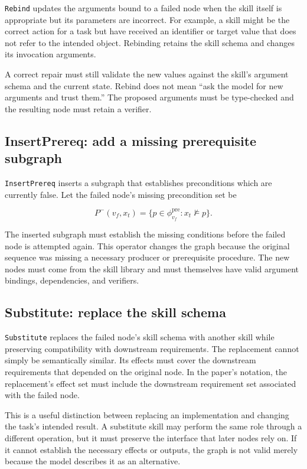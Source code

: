 \texttt{Rebind} updates the arguments bound to a failed node when the skill itself is appropriate but its parameters are incorrect. For example, a skill might be the correct action for a task but have received an identifier or target value that does not refer to the intended object. Rebinding retains the skill schema and changes its invocation arguments.

A correct repair must still validate the new values against the skill's argument schema and the current state. Rebind does not mean “ask the model for new arguments and trust them.” The proposed arguments must be type-checked and the resulting node must retain a verifier.

\subsection{InsertPrereq: add a missing prerequisite subgraph}

\texttt{InsertPrereq} inserts a subgraph that establishes preconditions which are currently false. Let the failed node's missing precondition set be

\[
 P^{-}(v_f,x_t)=\{p\in\phi_{v_f}^{\mathrm{pre}}:x_t\not\models p\}.
\]

The inserted subgraph must establish the missing conditions before the failed node is attempted again. This operator changes the graph because the original sequence was missing a necessary producer or prerequisite procedure. The new nodes must come from the skill library and must themselves have valid argument bindings, dependencies, and verifiers.

\subsection{Substitute: replace the skill schema}

\texttt{Substitute} replaces the failed node's skill schema with another skill while preserving compatibility with downstream requirements. The replacement cannot simply be semantically similar. Its effects must cover the downstream requirements that depended on the original node. In the paper's notation, the replacement's effect set must include the downstream requirement set associated with the failed node.\autocite{xia2026grasp}

This is a useful distinction between replacing an implementation and changing the task's intended result. A substitute skill may perform the same role through a different operation, but it must preserve the interface that later nodes rely on. If it cannot establish the necessary effects or outputs, the graph is not valid merely because the model describes it as an alternative.

